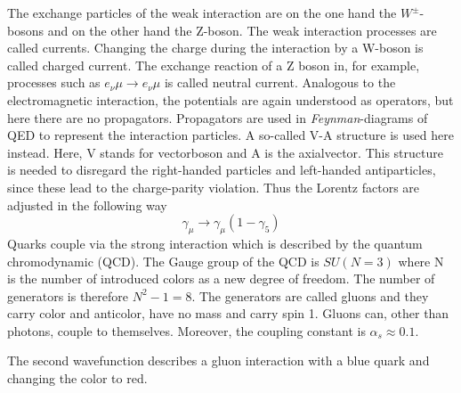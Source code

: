The exchange particles of the weak interaction are on the one hand the $W^{\pm}$-bosons and on the other hand the Z-boson.
The weak interaction processes are called currents.
Changing the charge during the interaction by a W-boson is called charged current.
The exchange reaction of a Z boson in, for example, processes such as $e_{\nu} \mu \to e_{\nu} \mu$ is called neutral current.
Analogous to the electromagnetic interaction, the potentials are again understood as
operators, but here there are no propagators. Propagators are
used in \textit{Feynman}-diagrams of QED to represent the interaction particles.
A so-called V-A structure is used here instead. Here, V stands for vectorboson and A is the axialvector.
This structure is needed to disregard the right-handed particles and left-handed
antiparticles, since these lead to the charge-parity violation. Thus the Lorentz factors are adjusted in the following way
\begin{equation*}
  \gamma_{\mu} \to \gamma_{\mu}(1 - \gamma_5)
\end{equation*}
Quarks couple via the strong interaction which is described by the quantum chromodynamic (QCD). The Gauge group of the QCD is $SU\left(N = 3\right)$ where N is the number of introduced colors as a new degree of freedom. The number of generators is therefore $N^2 - 1 = 8$.
The generators are called gluons and they carry color and anticolor, have no mass and carry spin 1.
Gluons can, other than photons, couple to themselves.
Moreover, the coupling constant is $\alpha_s \approx 0.1$.

The second wavefunction describes a gluon interaction with a blue quark and changing the color to red.


